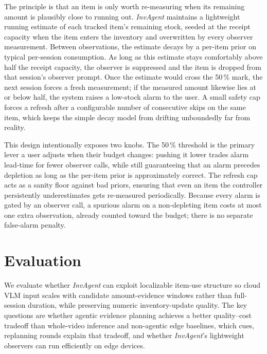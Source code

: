 \documentclass[sigconf,anonymous,nonacm]{acmart}
\newcommand{\sys}{\textit{InvAgent}\xspace}
\begin{document}
The principle is that an item is only worth re-measuring when its remaining amount is plausibly close to running out. \sys maintains a lightweight running estimate of each tracked item's remaining stock, seeded at the receipt capacity when the item enters the inventory and overwritten by every observer measurement. Between observations, the estimate decays by a per-item prior on typical per-session consumption. As long as this estimate stays comfortably above half the receipt capacity, the observer is suppressed and the item is dropped from that session's observer prompt. Once the estimate would cross the 50\,\% mark, the next session forces a fresh measurement; if the measured amount likewise lies at or below half, the system raises a low-stock alarm to the user. A small safety cap forces a refresh after a configurable number of consecutive skips on the same item, which keeps the simple decay model from drifting unboundedly far from reality.

This design intentionally exposes two knobs. The 50\,\% threshold is the primary lever a user adjusts when their budget changes: pushing it lower trades alarm lead-time for fewer observer calls, while still guaranteeing that an alarm precedes depletion as long as the per-item prior is approximately correct. The refresh cap acts as a sanity floor against bad priors, ensuring that even an item the controller persistently underestimates gets re-measured periodically. Because every alarm is gated by an observer call, a spurious alarm on a non-depleting item costs at most one extra observation, already counted toward the budget; there is no separate false-alarm penalty.


% 


\section{Evaluation}
\label{sec:evaluation}

We evaluate whether \sys can exploit localizable item-use structure so
cloud VLM input scales with candidate amount-evidence windows rather
than full-session duration, while preserving numeric inventory-update
quality. The key questions are whether agentic evidence
planning achieves a better quality--cost tradeoff than whole-video
inference and non-agentic edge baselines, which cues, replanning
rounds explain that tradeoff, and whether \sys's lightweight observers can run efficiently on edge devices.
\end{document}

